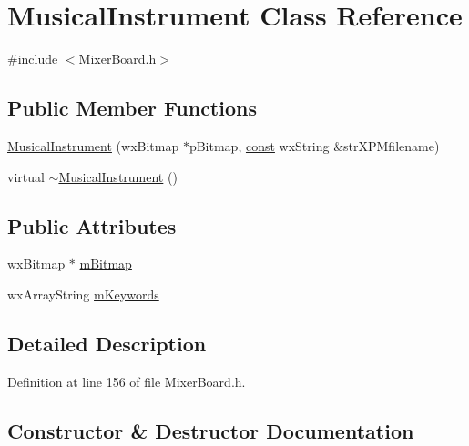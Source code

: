 \hypertarget{class_musical_instrument}{}\section{Musical\+Instrument Class Reference}
\label{class_musical_instrument}


{\ttfamily \#include $<$Mixer\+Board.\+h$>$}

\subsection*{Public Member Functions}
\begin{DoxyCompactItemize}
\item 
\hyperlink{class_musical_instrument_a0e3bed530e9c3c0c93fb7916d65b42a8}{Musical\+Instrument} (wx\+Bitmap $\ast$p\+Bitmap, \hyperlink{getopt1_8c_a2c212835823e3c54a8ab6d95c652660e}{const} wx\+String \&str\+X\+P\+Mfilename)
\item 
virtual \hyperlink{class_musical_instrument_a1e2b23aae391fca9dfb83b7f36c1eab0}{$\sim$\+Musical\+Instrument} ()
\end{DoxyCompactItemize}
\subsection*{Public Attributes}
\begin{DoxyCompactItemize}
\item 
wx\+Bitmap $\ast$ \hyperlink{class_musical_instrument_ab4962ca51e96c7ed14ff3e5e7f807ea7}{m\+Bitmap}
\item 
wx\+Array\+String \hyperlink{class_musical_instrument_acdfb0acd48788b3a402ae347b1367a9b}{m\+Keywords}
\end{DoxyCompactItemize}


\subsection{Detailed Description}


Definition at line 156 of file Mixer\+Board.\+h.



\subsection{Constructor \& Destructor Documentation}
